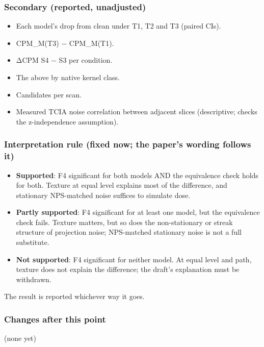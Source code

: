 \subsubsection*{Secondary (reported, unadjusted)}
\begin{itemize}
\item Each model's drop from clean under T1, T2 and T3 (paired CIs).
\item CPM\_M(T3) − CPM\_M(T1).
\item ΔCPM S4 − S3 per condition.
\item The above by native kernel class.
\item Candidates per scan.
\item Measured TCIA noise correlation between adjacent slices (descriptive; checks the z-independence assumption).
\end{itemize}

\subsubsection*{Interpretation rule (fixed now; the paper's wording follows it)}
\begin{itemize}
\item \textbf{Supported}: F4 significant for both models AND the equivalence check holds for both. Texture at equal level explains most of the difference, and stationary NPS-matched noise suffices to simulate dose.
\item \textbf{Partly supported}: F4 significant for at least one model, but the equivalence check fails. Texture matters, but so does the non-stationary or streak structure of projection noise; NPS-matched stationary noise is not a full substitute.
\item \textbf{Not supported}: F4 significant for neither model. At equal level and path, texture does not explain the difference; the draft's explanation must be withdrawn.
\end{itemize}

The result is reported whichever way it goes.

\subsubsection*{Changes after this point}
(none yet)

